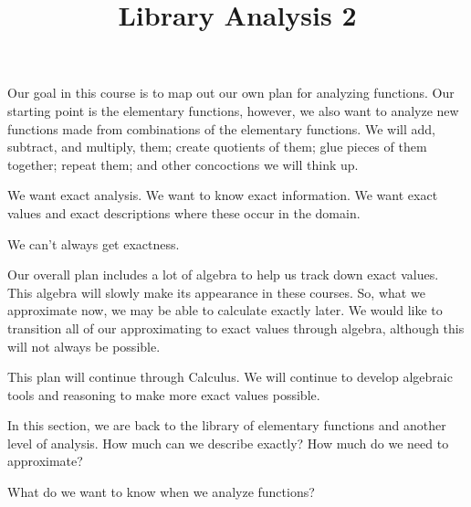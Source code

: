 \documentclass{ximera}
\title{Library Analysis 2}
\begin{document}
\begin{abstract}
\end{abstract}
\maketitle


Our goal in this course is to map out our own plan for analyzing functions.  Our starting point is the elementary functions, however, we also want to analyze new functions made from combinations of the elementary functions.  We will add, subtract, and multiply, them; create quotients of them; glue pieces of them together; repeat them; and other concoctions we will think up.

We want exact analysis.  We want to know exact information.  We want exact values and exact descriptions where these occur in the domain.

We can't always get exactness. 

Our overall plan includes a lot of algebra to help us track down exact values.  This algebra will slowly make its appearance in these courses.  So, what we approximate now, we may be able to calculate exactly later.  We would like to transition all of our approximating to exact values through algebra, although this will not always be possible.

This plan will continue through Calculus.  We will continue to develop algebraic tools and reasoning to make more exact values possible.

In this section, we are back to the library of elementary functions and another level of analysis.  How much can we describe exactly? How much do we need to approximate?



What do we want to know when we analyze functions?
\end{document}
